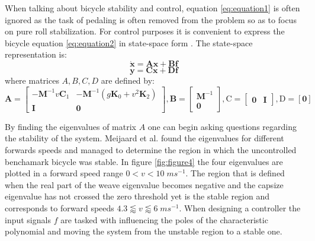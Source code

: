 When talking about bicycle stability and control, equation \ref{eq:equation1} is often ignored as the task of pedaling is often removed from the problem so as to focus on pure roll stabilization. For control purposes it is convenient to express the bicycle equation \ref{eq:equation2} in state-space form . The state-space representation is:
\begin{equation}
    \dot{\mathbf{x}}=\mathbf{A} \mathbf{x}+\mathbf{B} \mathbf{f}
\end{equation}
\begin{equation}
    \mathbf{y}=\mathbf{C} \mathbf{x}+\mathbf{D} \mathbf{f}
\end{equation}
where matrices \ensuremath{A,B,C,D} are defined by:
\begin{equation}
    \mathbf{A}=\begin{bmatrix}
        -\mathbf{M}^{-1}v\mathbf{C}_{1} & -\mathbf{M}^{-1}(g \mathbf{K}_{0}+v^{2}\mathbf{K}_{2}) \\
        {\mathbf{I}}                    & {\mathbf{0}}
    \end{bmatrix} , \mathbf{B}=\left[ \begin{array}{c}{\mathbf{M}^{-1}} \\ {\mathbf{0}}\end{array}\right] ,
    \mathrm{C}=\begin{bmatrix} {\mathbf{0}} & {\mathbf{I}}
    \end{bmatrix} , \mathrm{D}=[\mathbf{0}]
\end{equation}
\par
By finding the eigenvalues of matrix \ensuremath{A} one can begin asking questions regarding the stability of the system. Meijaard et al. \cite{meijaard2007linearized} found the eigenvalues for different forwards speeds and managed to determine the region in which the uncontrolled benchamark bicycle was stable. In figure \ref{fig:figure4} the four eigenvalues are plotted in a forward speed range \ensuremath{0<v<10\; ms^{-1}}. The region that is defined when the real part of the weave eigenvalue becomes negative and the capsize eigenvalue has not crossed the zero threshold yet is the stable region and corresponds to forward speeds  \ensuremath{4.3\lessapprox v \lessapprox 6\; ms^{-1}}. When designing a controller  the input signals \ensuremath{f} are tasked with influencing the poles of the characteristic polynomial and moving the system from the unstable region to a stable one.


